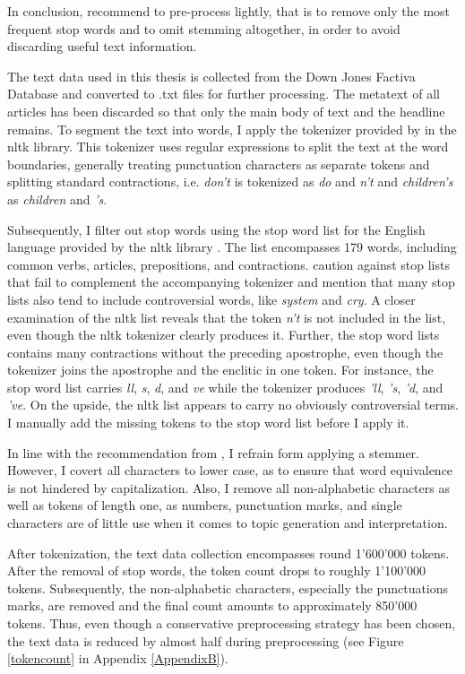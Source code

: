 \documentclass[11pt,a4paper,english,oneside]{book}
\numberwithin{equation}{chapter}
\begin{document}
In conclusion, \cite{Schofield.2017} recommend to pre-process lightly, that is to remove only the most frequent stop words and to omit stemming altogether, in order to avoid discarding useful text information. 

The text data used in this thesis is collected from the Down Jones Factiva Database and converted to .txt files for further processing. The metatext of all articles has been discarded so that only the main body of text and the headline remains. To segment the text into words, I apply the tokenizer provided by \cite{Bird.2010} in the nltk library. This tokenizer uses regular expressions to split the text at the word boundaries, generally treating punctuation characters as separate tokens and splitting standard contractions, i.e. \textit{don't} is tokenized as \textit{do} and \textit{n't} and \textit{children's} as \textit{children} and \textit{'s}. 

Subsequently, I filter out stop words using the stop word list for the English language provided by the nltk library \citep{Bird.2010}. The list encompasses 179 words, including common verbs, articles, prepositions, and contractions. \citet[p. 8--9]{Nothman.2018} caution against stop lists that fail to complement the accompanying tokenizer and mention that many stop lists also tend to include controversial words, like \textit{system} and \textit{cry}. A closer examination of the nltk list reveals that the token \textit{n't} is not included in the list, even though the nltk tokenizer clearly produces it. Further, the stop word lists contains many contractions without the preceding apostrophe, even though the tokenizer joins the apostrophe and the enclitic in one token. For instance, the stop word list carries \textit{ll}, \textit{s}, \textit{d}, and \textit{ve} while the tokenizer produces \textit{'ll}, \textit{'s}, \textit{'d}, and \textit{'ve}. On the upside, the nltk list appears to carry no obviously controversial terms. I manually add the missing tokens to the stop word list before I apply it. 

In line with the recommendation from \cite{Schofield.2017}, I refrain form applying a stemmer. However, I covert all characters to lower case, as to ensure that word equivalence is not hindered by capitalization. Also, I remove all non-alphabetic characters as well as tokens of length one, as numbers, punctuation marks, and single characters are of little use when it comes to topic generation and interpretation. 

After tokenization, the text data collection encompasses round 1'600'000 tokens. After the removal of stop words, the token count drops to roughly 1'100'000 tokens. Subsequently, the non-alphabetic characters, especially the punctuations marks, are removed and the final count amounts to approximately 850'000 tokens. Thus, even though a conservative preprocessing strategy has been chosen, the text data is reduced by almost half during preprocessing (see Figure \ref{tokencount} in Appendix \ref{AppendixB}).
\end{document}
